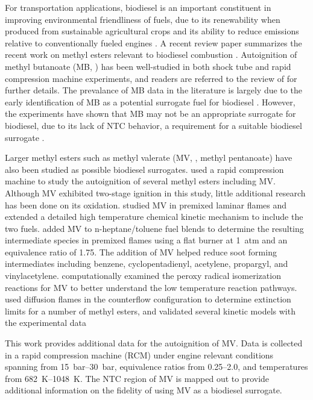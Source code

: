 \documentclass[12pt]{../ussci}
\begin{document}
For transportation applications, biodiesel is an important constituent in
improving environmental friendliness of fuels, due to its renewability when
produced from sustainable agricultural crops and its ability to reduce emissions
relative to conventionally fueled engines \autocite{Hoekman2012}. A recent review paper summarizes the recent work on methyl esters relevant to
biodiesel combustion \autocite{Coniglio2013}. Autoignition of methyl butanoate
(MB, ) has been well-studied in both shock tube and rapid
compression machine experiments, and readers are referred to the review of
\textcite{Coniglio2013} for further details. The prevalance of MB data in the
literature is largely due to the early identification of MB as a potential
surrogate fuel for biodiesel \autocite{Fisher2000}. However, the
experiments have shown that MB may not be an appropriate surrogate for
biodiesel, due to its lack of NTC behavior, a requirement for a suitable
biodiesel surrogate \autocite{Coniglio2013}.

Larger methyl esters such as methyl valerate (MV, , methyl
pentanoate) have also been studied as possible biodiesel surrogates.
\textcite{Hadj-Ali2009} used a rapid compression machine to study the
autoignition of several methyl esters including MV. Although MV exhibited
two-stage ignition in this study, little additional research has been done on
its oxidation. \textcite{Korobeinichev2015} studied MV in premixed laminar
flames and extended a detailed high temperature chemical kinetic mechanism to
include the two fuels. \textcite{Dmitriev2015} added MV to n-heptane/toluene
fuel blends to determine the resulting intermediate species in premixed flames
using a flat burner at \SI{1}{atm} and an equivalence ratio of 1.75. The
addition of MV helped reduce soot forming intermediates including benzene,
cyclopentadienyl, acetylene, propargyl, and vinylacetylene. \textcite{Hayes2009}
computationally examined the peroxy radical isomerization reactions for MV to
better understand the low temperature reaction pathways. \textcite{Dievart2013}
used diffusion flames in the counterflow configuration to determine extinction
limits for a number of methyl esters, and validated several kinetic models with
the experimental data

This work provides additional data for the autoignition of MV. Data is collected
in a rapid compression machine (RCM) under engine relevant conditions spanning
from \SIrange{15}{30}{\bar}, equivalence ratios from \numrange{0.25}{2.0}, and
temperatures from \SIrange{682}{1048}{\K}. The NTC region of MV is mapped out to
provide additional information on the fidelity of using MV as a biodiesel
surrogate.
\end{document}
